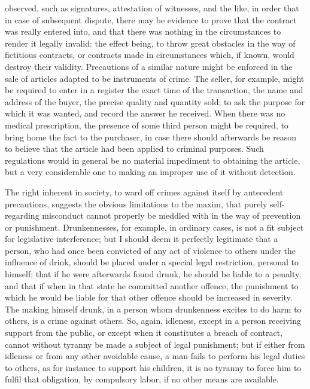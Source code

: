 \documentclass[12pt]{report}
\begin{document}
observed, such as signatures, attestation of witnesses, and the like, in order that in case of subsequent dispute, there may be evidence to prove that the contract was really entered into, and that there was nothing in the circumstances to render it legally invalid: the effect being, to throw great obstacles in the way of fictitious contracts, or contracts made in circumstances which, if known, would destroy their validity. Precautions of a similar nature might be enforced in the sale of articles adapted to be instruments of crime. The seller, for example, might be required to enter in a register the exact time of the transaction, the name and address of the buyer, the precise quality and quantity sold; to ask the purpose for which it was wanted, and record the answer he received. When there was no medical prescription, the presence of some third person might be required, to bring home the fact to the purchaser, in case there should afterwards be reason to believe that the article had been applied to criminal purposes. Such regulations would in general be no material impediment to obtaining the article, but a very considerable one to making an improper use of it without detection.

The right inherent in society, to ward off crimes against itself by antecedent precautions, suggests the obvious limitations to the maxim, that purely self-regarding misconduct cannot properly be meddled with in the way of prevention or punishment. Drunkennesses, for example, in ordinary cases, is not a fit subject for legislative interference; but I should deem it perfectly legitimate that a person, who had once been convicted of any act of violence to others under the influence of drink, should be placed under a special legal restriction, personal to himself; that if he were afterwards found drunk, he should be liable to a penalty, and that if when in that state he committed another offence, the punishment to which he would be liable for that other offence should be increased in severity. The making himself drunk, in a person whom drunkenness excites to do harm to others, is a crime against others. So, again, idleness, except in a person receiving support from the public, or except when it constitutes a breach of contract, cannot without tyranny be made a subject of legal punishment; but if either from idleness or from any other avoidable cause, a man fails to perform his legal duties to others, as for instance to support his children, it is no tyranny to force him to fulfil that obligation, by compulsory labor, if no other means are available.
\end{document}
